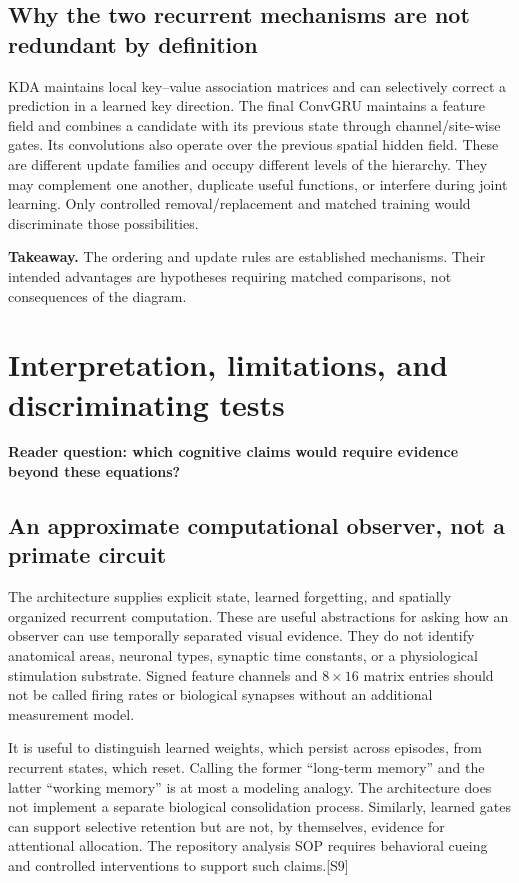 \documentclass[10pt,letterpaper]{article}
\newcommand{\src}[1]{\textcolor{accent}{\textsf{[#1]}}}
\newcommand{\takeaway}[1]{\par\smallskip\noindent\textbf{Takeaway.} #1}
\newcommand{\psection}[1]{\clearpage\section{#1}}
\begin{document}
\subsection{Why the two recurrent mechanisms are not redundant by definition}
KDA maintains local key--value association matrices and can selectively correct a prediction in a learned key direction. The final ConvGRU maintains a feature field and combines a candidate with its previous state through channel/site-wise gates. Its convolutions also operate over the previous spatial hidden field. These are different update families and occupy different levels of the hierarchy. They may complement one another, duplicate useful functions, or interfere during joint learning. Only controlled removal/replacement and matched training would discriminate those possibilities.

\takeaway{The ordering and update rules are established mechanisms. Their intended advantages are hypotheses requiring matched comparisons, not consequences of the diagram.}

\psection{Interpretation, limitations, and discriminating tests}
\textbf{Reader question: which cognitive claims would require evidence beyond these equations?}
\subsection{An approximate computational observer, not a primate circuit}
The architecture supplies explicit state, learned forgetting, and spatially organized recurrent computation. These are useful abstractions for asking how an observer can use temporally separated visual evidence. They do not identify anatomical areas, neuronal types, synaptic time constants, or a physiological stimulation substrate. Signed feature channels and $8\times16$ matrix entries should not be called firing rates or biological synapses without an additional measurement model.

It is useful to distinguish learned weights, which persist across episodes, from recurrent states, which reset. Calling the former ``long-term memory'' and the latter ``working memory'' is at most a modeling analogy. The architecture does not implement a separate biological consolidation process. Similarly, learned gates can support selective retention but are not, by themselves, evidence for attentional allocation. The repository analysis SOP requires behavioral cueing and controlled interventions to support such claims.\src{S9}
\end{document}
